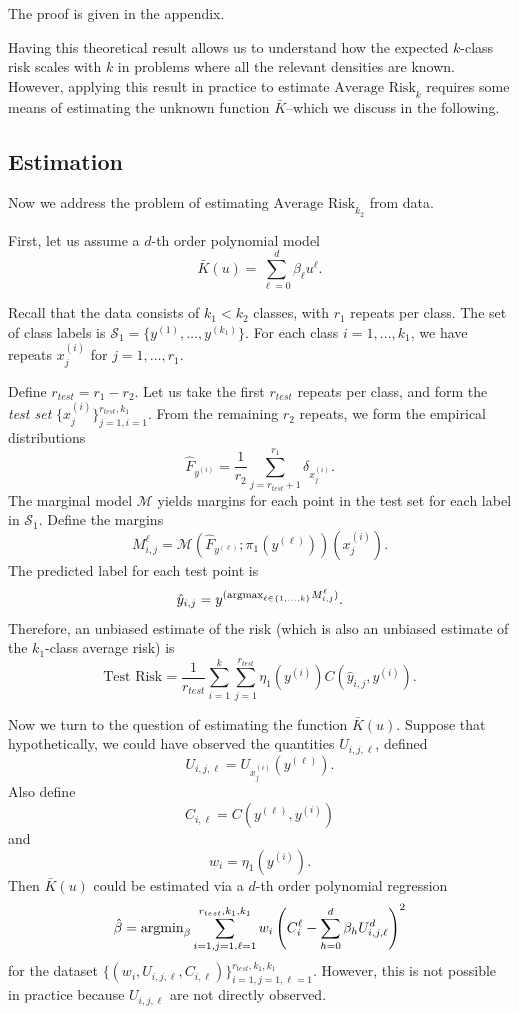 \documentclass[12pt]{article}
\begin{document}
The proof is given in the appendix.

Having this theoretical result allows us to understand how the
expected $k$-class risk scales with $k$ in problems where all the
relevant densities are known.  However, applying this result in
practice to estimate $\text{Average Risk}_k$ requires some means of
estimating the unknown function $\bar{K}$--which we discuss in the
following.

\subsection{Estimation}

Now we address the problem of estimating $\text{Average Risk}_{k_2}$
from data.  

First, let us assume a $d$-th order polynomial model
\[
\bar{K}(u) = \sum_{\ell = 0}^d \beta_\ell u^\ell.
\]

Recall that the data consists of $k_1 < k_2$ classes, with
$r_1$ repeats per class.  The set of class labels is $\mathcal{S}_1 =
\{y^{(1)},\hdots, y^{(k_1)}\}$.  For each class $i = 1,\hdots, k_1$,
we have repeats $x_j^{(i)}$ for $j = 1,\hdots, r_1$.

Define $r_{test} = r_1 - r_2$.  Let us take the first $r_{test}$
repeats per class, and form the \emph{test set} $\{x_j^{(i)}\}_{j=1,
  i=1}^{r_{test}, k_1}$.  From the remaining $r_2$ repeats, we form
the empirical distributions
\[
\hat{F}_{y^{(i)}} = \frac{1}{r_2}\sum_{j=r_{test} + 1}^{r_1} \delta_{x_j^{(i)}}.
\]
The marginal model $\mathcal{M}$ yields margins for each point in the
test set for each label in $\mathcal{S}_1$.  Define the margins
\[
M_{i, j}^\ell = \mathcal{M}(\hat{F}_{y^{(\ell)}}; \pi_1(y^{(\ell)}))(x_j^{(i)}).
\]
The predicted label for each test point is
\[
\hat{y}_{i,j} = y^{(\text{argmax}_{\ell \in \{1,\hdots, k\}} M_{i, j}^\ell)}.
\]
Therefore, an unbiased estimate of the risk (which is also an unbiased
estimate of the $k_1$-class average risk) is
\[
\text{Test Risk} = \frac{1}{r_{test}}\sum_{i=1}^k \sum_{j=1}^{r_{test}} \eta_1(y^{(i)}) C(\hat{y}_{i, j}, y^{(i)}).
\]

Now we turn to the question of estimating the function $\bar{K}(u)$.
Suppose that hypothetically, we could have observed the quantities
$U_{i, j, \ell}$, defined
\[
U_{i, j, \ell} = U_{x_j^{(i)}}(y^{(\ell)}).
\]
Also define
\[
C_{i,\ell} = C(y^{(\ell)}, y^{(i)})
\]
and
\[
w_i = \eta_1(y^{(i)}).
\]
Then $\bar{K}(u)$ could be estimated via a $d$-th order polynomial regression
\[
\hat{\beta} = \text{argmin}_{\beta} \sum_{i=1,j=1, \ell=1}^{r_{test}, k_1, k_1} w_i \left(C_i^\ell - \sum_{h=0}^d \beta_h U_{i,j, \ell}^d\right)^2
\]
for the
dataset $\{(w_i, U_{i,j, \ell}, C_{i,\ell})\}_{i=1, j=1,
  \ell=1}^{r_{test}, k_1, k_1}$.  However, this is not possible in
practice because $U_{i,j,\ell}$ are not directly observed.
\end{document}
